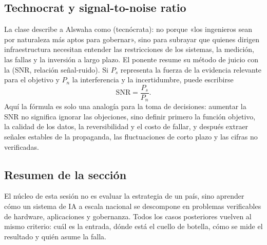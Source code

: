 \subsection{Technocrat y signal-to-noise ratio}

La clase describe a Alswaha como  (tecnócrata): no porque «los ingenieros sean por naturaleza más aptos para gobernar», sino para subrayar que quienes dirigen infraestructura necesitan entender las restricciones de los sistemas, la medición, las fallas y la inversión a largo plazo. El ponente resume su método de juicio con la  (SNR, relación señal-ruido). Si $P_s$ representa la fuerza de la evidencia relevante para el objetivo y $P_n$ la interferencia y la incertidumbre, puede escribirse
\[
\mathrm{SNR}=\frac{P_s}{P_n}.
\]
Aquí la fórmula es solo una analogía para la toma de decisiones: aumentar la SNR no significa ignorar las objeciones, sino definir primero la función objetivo, la calidad de los datos, la reversibilidad y el costo de fallar, y después extraer señales estables de la propaganda, las fluctuaciones de corto plazo y las cifras no verificadas.


\subsection{Resumen de la sección}

El núcleo de esta sesión no es evaluar la estrategia de un país, sino aprender cómo un sistema de IA a escala nacional se descompone en problemas verificables de hardware, aplicaciones y gobernanza. Todos los casos posteriores vuelven al mismo criterio: cuál es la entrada, dónde está el cuello de botella, cómo se mide el resultado y quién asume la falla.
